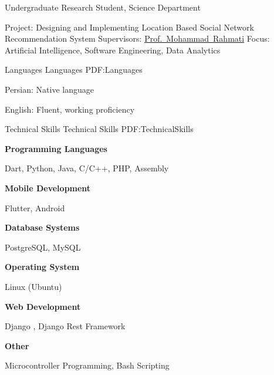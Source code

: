\documentclass[letterpaper,MMMyyyy,nonstopmode]{resume}
\begin{document}
\begin{Body}
\Gap
\BulletItem
Undergraduate Research Student, Science Department
\begin{Detail}
\SubBulletItem
Project:
Designing and Implementing Location Based Social Network Recommendation System
\SubBulletItem
Supervisors:
\href{https://aut.ac.ir/cv/2416/Mohammad-Rahmati?slc_lang=en&&cv=2416&mod=scv}
{Prof.~Mohammad~Rahmati}
\SubBulletItem
Focus: Artificial Intelligence, Software Engineering, Data Analytics
\end{Detail}


\Section
{Languages}
{Languages}
{PDF:Languages}

\BigGap
\BulletItem
Persian: Native language

\Gap
\BulletItem
English: Fluent, working proficiency


\Section
{Technical Skills}
{Technical Skills}
{PDF:TechnicalSkills}

\BigGap
\BulletItem
\textbf{Programming Languages}
\begin{Detail}
\Item
Dart, Python, Java, C/C++, PHP, Assembly
\end{Detail}

\Gap
\BulletItem
\textbf{Mobile Development}
\begin{Detail}
\Item
Flutter, Android
\end{Detail}

\Gap
\BulletItem
\textbf{Database Systems}
\begin{Detail}
\Item
PostgreSQL, MySQL
\end{Detail}


\Gap
\BulletItem
\textbf{Operating System}
\begin{Detail}
\Item
Linux (Ubuntu)
\end{Detail}

\Gap
\BulletItem
\textbf{Web Development}
\begin{Detail}
\Item
Django , Django Rest Framework
\end{Detail}

\Gap
\BulletItem
\textbf{Other}
\begin{Detail}
\Item
Microcontroller Programming, Bash Scripting
\end{Detail}


\end{Body}
\end{document}
